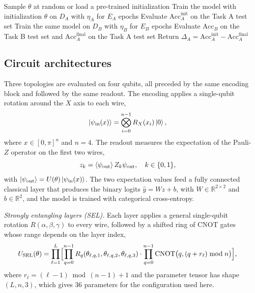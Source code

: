 \documentclass[preprint,number,sort&compress]{elsarticle}
\begin{document}
\begin{algorithm}[ht]
\small
\caption{Cross-domain sequential protocol with synthetic pre-training.}
\label{alg:protocol}
Sample $\theta$ at random or load a pre-trained initialization \;
Train the model with initialization $\theta$ on $D_A$ with $\eta_A$ for $E_A$ epochs \;
Evaluate $\mathrm{Acc}_A^{\text{init}}$ on the Task A test set \;
Train the same model on $D_B$ with $\eta_B$ for $E_B$ epochs \;
Evaluate $\mathrm{Acc}_B$ on the Task B test set and $\mathrm{Acc}_A^{\text{final}}$ on the Task A test set \;
Return $\Delta_A = \mathrm{Acc}_A^{\text{init}} - \mathrm{Acc}_A^{\text{final}}$ \;
\end{algorithm}

\subsection{Circuit architectures}

Three topologies are evaluated on four qubits, all preceded by the same
encoding block and followed by the same readout. The encoding applies a
single-qubit rotation around the $X$ axis to each wire,
\begin{equation}
  \ket{\psi_{\text{in}}(x)} = \bigotimes_{i=0}^{n-1} R_X(x_i)\ket{0},
  \label{eq:encoding}
\end{equation}
where $x \in [0,\pi]^{n}$ and $n=4$. The readout measures the expectation of
the Pauli-$Z$ operator on the first two wires,
\begin{equation}
  z_k = \braket{\psi_{\text{out}}}{Z_k}{\psi_{\text{out}}}, \quad k \in \{0, 1\},
  \label{eq:readout}
\end{equation}
with $\ket{\psi_{\text{out}}} = U(\theta)\ket{\psi_{\text{in}}(x)}$. The two
expectation values feed a fully connected classical layer that produces the
binary logits $\hat{y} = Wz + b$, with $W \in \mathbb{R}^{2\times 2}$ and
$b \in \mathbb{R}^{2}$, and the model is trained with categorical
cross-entropy.

\emph{Strongly entangling layers (SEL).} Each layer applies a general
single-qubit rotation $R(\alpha, \beta, \gamma)$ to every wire, followed by a
shifted ring of CNOT gates whose range depends on the layer index,
\begin{equation}
  U_{\text{SEL}}(\theta) = \prod_{\ell=1}^{L}
  \Bigl[\prod_{q=0}^{n-1} R_q(\theta_{\ell,q,1}, \theta_{\ell,q,2}, \theta_{\ell,q,3}) \cdot
  \prod_{q=0}^{n-1} \mathrm{CNOT}\bigl(q, (q + r_\ell) \bmod n\bigr)\Bigr],
  \label{eq:sel}
\end{equation}
where $r_\ell = (\ell - 1) \bmod (n-1) + 1$ and the parameter tensor has
shape $(L, n, 3)$, which gives $36$ parameters for the configuration used
here.
\end{document}
